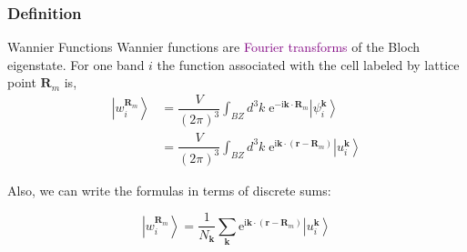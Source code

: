 \documentclass{beamer}
\begin{document}
  \begin{frame}
    \frametitle{Definition}
    \begin{block}{Wannier Functions}
      Wannier functions are \textcolor{purple}{Fourier transforms} of the Bloch eigenstate. For one band \(i\) the function associated with the cell labeled by lattice point \(\mathbf{R}_m\) is,
      \begin{equation}
        \begin{aligned}
          \left|w_i^{\mathbf{R}_m}\right\rangle &= \dfrac{V}{(2\pi)^3}\int_{BZ}d^3k\;\mathrm{e}^{-\mathrm{i}\mathbf{k}\cdot\mathbf{R}_m}\left|\psi_i^{\mathbf{k}}\right\rangle\\
          &=\dfrac{V}{(2\pi)^3}\int_{BZ}d^3k\;\mathrm{e}^{\mathrm{i}\mathbf{k}\cdot(\mathbf{r}-\mathbf{R}_m)}\left|u_i^{\mathbf{k}}\right\rangle
        \end{aligned}
      \end{equation}

      Also, we can write the formulas in terms of discrete sums:

      \begin{equation}
        \left|w_i^{\mathbf{R}_m}\right\rangle =\dfrac{1}{N_\mathbf{k}}\sum_{\mathbf{k}}\mathrm{e}^{\mathrm{i}\mathbf{k}\cdot(\mathbf{r}-\mathbf{R}_m)}\left|u_i^{\mathbf{k}}\right\rangle
      \end{equation}
    \end{block}

    \end{frame}
\end{document}
